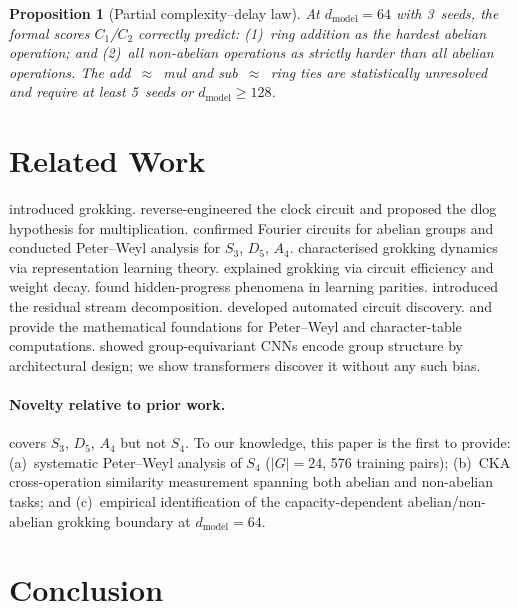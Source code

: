 \documentclass[11pt]{article}
\newtheorem{proposition}{Proposition}[section]
\begin{document}
\begin{proposition}[Partial complexity--delay law]
  \label{prop:delay}
  At $d_{\text{model}}=64$ with 3~seeds, the formal scores $C_1$/$C_2$
  correctly predict: (1)~ring addition as the hardest abelian operation;
  and (2)~all non-abelian operations as strictly harder than all abelian
  operations. The add~$\approx$~mul and sub~$\approx$~ring ties are
  statistically unresolved and require at least 5~seeds or
  $d_{\text{model}}\geq128$.
\end{proposition}

\section{Related Work}
\label{sec:related}

\citet{power2022grokking} introduced grokking. \citet{nanda2023progress}
reverse-engineered the clock circuit and proposed the dlog hypothesis for
multiplication. \citet{chughtai2023toy} confirmed Fourier circuits for
abelian groups and conducted Peter--Weyl analysis for $S_3$, $D_5$, $A_4$.
\citet{liu2022towards} characterised grokking dynamics via representation
learning theory. \citet{varma2023explaining} explained grokking via circuit
efficiency and weight decay. \citet{barak2022hidden} found hidden-progress
phenomena in learning parities. \citet{elhage2021mathematical} introduced
the residual stream decomposition. \citet{conmy2023towards} developed
automated circuit discovery. \citet{diaconis1988group} and
\citet{serre1977linear} provide the mathematical foundations for Peter--Weyl
and character-table computations. \citet{cohen2016group} showed
group-equivariant CNNs encode group structure by architectural design; we
show transformers discover it without any such bias.

\paragraph{Novelty relative to prior work.}
\citet{chughtai2023toy} covers $S_3$, $D_5$, $A_4$ but not $S_4$.
To our knowledge, this paper is the first to provide:
(a)~systematic Peter--Weyl analysis of $S_4$ ($|G|{=}24$, 576 training pairs);
(b)~CKA cross-operation similarity measurement spanning both abelian and
non-abelian tasks; and
(c)~empirical identification of the capacity-dependent abelian/non-abelian
grokking boundary at $d_{\text{model}}=64$.

\section{Conclusion}
\label{sec:conclusion}
\end{document}
